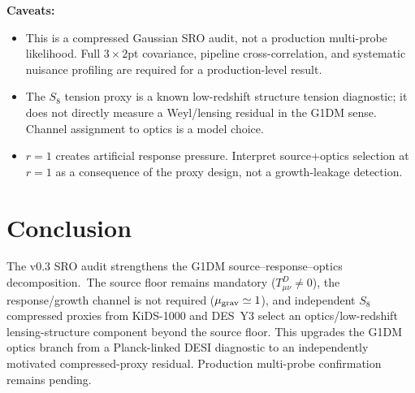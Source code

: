 \documentclass[11pt]{article}
\begin{document}
\vspace{0.3em}
\noindent\textbf{Caveats:}
\begin{itemize}
\item This is a compressed Gaussian SRO audit, not a production multi-probe
  likelihood.  Full $3\times2$pt covariance, pipeline cross-correlation,
  and systematic nuisance profiling are required for a production-level result.
\item The $S_8$ tension proxy is a known low-redshift structure tension
  diagnostic; it does not directly measure a Weyl/lensing residual in the
  G1DM sense.  Channel assignment to optics is a model choice.
\item $r=1$ creates artificial response pressure.  Interpret source+optics
  selection at $r=1$ as a consequence of the proxy design, not a growth-leakage
  detection.
\end{itemize}

\section{Conclusion}

The v0.3 SRO audit strengthens the G1DM source--response--optics
decomposition.\  The source floor remains mandatory ($T_{\mu\nu}^{D}\neq0$),
the response/growth channel is not required ($\mu_{\rm grav}\simeq1$), and
independent $S_8$ compressed proxies from KiDS-1000 and DES~Y3 select an
optics/low-redshift lensing-structure component beyond the source floor.
This upgrades the G1DM optics branch from a Planck-linked DESI diagnostic to
an independently motivated compressed-proxy residual.  Production multi-probe
confirmation remains pending.
\end{document}
